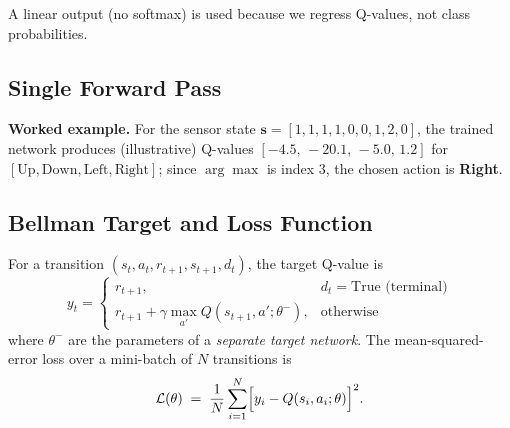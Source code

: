 \documentclass[11pt]{article}
\begin{document}
A linear output (no softmax) is used because we regress Q-values, not class probabilities.

\subsection{Single Forward Pass}

\begin{center}
\end{center}

\noindent\textbf{Worked example.} For the sensor state $\mathbf{s}=[1,1,1,1,0,0,1,2,0]$, the trained network produces (illustrative) Q-values $[-4.5,\,-20.1,\,-5.0,\,1.2]$ for $[\text{Up},\text{Down},\text{Left},\text{Right}]$; since $\arg\max$ is index 3, the chosen action is \textbf{Right}.

\subsection{Bellman Target and Loss Function}

For a transition $(s_t, a_t, r_{t+1}, s_{t+1}, d_t)$, the target Q-value is
\[
y_t =
\begin{cases}
r_{t+1}, & d_t = \text{True (terminal)} \\
r_{t+1} + \gamma \max_{a'} Q(s_{t+1}, a'; \theta^{-}), & \text{otherwise}
\end{cases}
\]
where $\theta^{-}$ are the parameters of a \emph{separate target network}. The mean-squared-error loss over a mini-batch of $N$ transitions is
\[
\mathcal{L}(\theta) \;=\; \frac{1}{N} \sum_{i=1}^{N} \Bigl[ y_i - Q(s_i, a_i; \theta) \Bigr]^2.
\]
\end{document}
